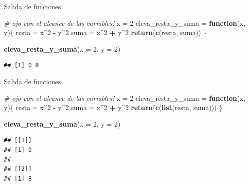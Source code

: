 \documentclass[ignorenonframetext,]{beamer}
\newenvironment{Shaded}{\begin{snugshade}}{\end{snugshade}}
\newcommand{\CommentTok}[1]{\textcolor[rgb]{0.56,0.35,0.01}{\textit{#1}}}
\newcommand{\ControlFlowTok}[1]{\textcolor[rgb]{0.13,0.29,0.53}{\textbf{#1}}}
\newcommand{\DataTypeTok}[1]{\textcolor[rgb]{0.13,0.29,0.53}{#1}}
\newcommand{\DecValTok}[1]{\textcolor[rgb]{0.00,0.00,0.81}{#1}}
\newcommand{\KeywordTok}[1]{\textcolor[rgb]{0.13,0.29,0.53}{\textbf{#1}}}
\newcommand{\NormalTok}[1]{#1}
\newcommand{\OperatorTok}[1]{\textcolor[rgb]{0.81,0.36,0.00}{\textbf{#1}}}
\newcommand{\StringTok}[1]{\textcolor[rgb]{0.31,0.60,0.02}{#1}}
\begin{document}
\begin{frame}[fragile]{Salida de funciones}
\protect\hypertarget{salida-de-funciones}{}

\begin{Shaded}
\begin{Highlighting}[]
\CommentTok{# ojo con el alcance de las variables!}
\NormalTok{x =}\StringTok{ }\DecValTok{2}
\NormalTok{eleva_resta_y_suma =}\StringTok{ }\ControlFlowTok{function}\NormalTok{(x, y)\{}
\NormalTok{  resta =}\StringTok{ }\NormalTok{x}\OperatorTok{^}\DecValTok{2} \OperatorTok{-}\StringTok{ }\NormalTok{y}\OperatorTok{^}\DecValTok{2}
\NormalTok{  suma =}\StringTok{ }\NormalTok{x}\OperatorTok{^}\DecValTok{2} \OperatorTok{+}\StringTok{ }\NormalTok{y}\OperatorTok{^}\DecValTok{2}
  \KeywordTok{return}\NormalTok{(}\KeywordTok{c}\NormalTok{(resta, suma))}
\NormalTok{\}}

\KeywordTok{eleva_resta_y_suma}\NormalTok{(}\DataTypeTok{x =} \DecValTok{2}\NormalTok{, }\DataTypeTok{y =} \DecValTok{2}\NormalTok{)}
\end{Highlighting}
\end{Shaded}

\begin{verbatim}
## [1] 0 8
\end{verbatim}

\end{frame}

\begin{frame}[fragile]{Salida de funciones}
\protect\hypertarget{salida-de-funciones-1}{}

\begin{Shaded}
\begin{Highlighting}[]
\CommentTok{# ojo con el alcance de las variables!}
\NormalTok{x =}\StringTok{ }\DecValTok{2}
\NormalTok{eleva_resta_y_suma =}\StringTok{ }\ControlFlowTok{function}\NormalTok{(x, y)\{}
\NormalTok{  resta =}\StringTok{ }\NormalTok{x}\OperatorTok{^}\DecValTok{2} \OperatorTok{-}\StringTok{ }\NormalTok{y}\OperatorTok{^}\DecValTok{2}
\NormalTok{  suma =}\StringTok{ }\NormalTok{x}\OperatorTok{^}\DecValTok{2} \OperatorTok{+}\StringTok{ }\NormalTok{y}\OperatorTok{^}\DecValTok{2}
  \KeywordTok{return}\NormalTok{(}\KeywordTok{c}\NormalTok{(}\KeywordTok{list}\NormalTok{(resta, suma)))}
\NormalTok{\}}

\KeywordTok{eleva_resta_y_suma}\NormalTok{(}\DataTypeTok{x =} \DecValTok{2}\NormalTok{, }\DataTypeTok{y =} \DecValTok{2}\NormalTok{)}
\end{Highlighting}
\end{Shaded}

\begin{verbatim}
## [[1]]
## [1] 0
## 
## [[2]]
## [1] 8
\end{verbatim}

\end{frame}
\end{document}
